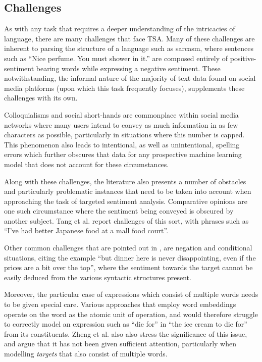 \documentclass[../../fyp.tex]{subfiles}
\begin{document}
 
\subsection{Challenges}
As with any task that requires a deeper understanding of the intricacies of language, there are many challenges that face TSA. Many of these challenges are inherent to parsing the structure of a language such as sarcasm, where sentences such as \enquote{Nice perfume. You must shower in it.} \cite{kharde2016} are composed entirely of positive-sentiment bearing words while expressing a negative sentiment. These notwithstanding, the informal nature of the majority of text data found on social media platforms (upon which this task frequently focuses), supplements these challenges with its own.

Colloquialisms and social short-hands are commonplace within social media networks where many users intend to convey as much information in as few characters as possible, particularly in situations where this number is capped. This phenomenon also leads to intentional, as well as unintentional, spelling errors which further obscures that data for any prospective machine learning model that does not account for these circumstances.

Along with these challenges, the literature also presents a number of obstacles and particularly problematic instances that need to be taken into account when approaching the task of targeted sentiment analysis. Comparative opinions are one such circumstance where the sentiment being conveyed is obscured by another subject. Tang et al. \cite{tang2016} report challenges of this sort, with phrases such as \enquote{I've had better Japanese food at a mall food court}.

Other common challenges that are pointed out in \cite{tang2016}, are negation and conditional situations, citing the example \enquote{but dinner here is never disappointing, even if the prices are a bit over the top}, where the sentiment towards the target cannot be easily deduced from the various syntactic structures present.

Moreover, the particular case of expressions which consist of multiple words needs to be given special care. Various approaches that employ word embeddings operate on the word as the atomic unit of operation, and would therefore struggle to correctly model an expression such as \enquote{die for} in \enquote{the ice cream to die for} \cite{tang2016} from its constituents. Zheng et al. \cite{zheng2018} also also stress the significance of this issue, and argue that it has not been given sufficient attention, particularly when modelling \textit{targets} that also consist of multiple words.
\end{document}
